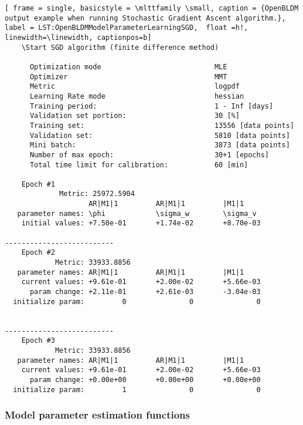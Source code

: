  \begin{lstlisting}[ frame = single, basicstyle = \mlttfamily \small, caption = {OpenBLDM output example when running Stochastic Gradient Ascent algorithm.}, label = LST:OpenBLDMModelParameterLearningSGD,  float =h!, linewidth=\linewidth, captionpos=b]
    \Start SGD algorithm (finite difference method)

      Optimization mode                           MLE
      Optimizer                                   MMT
      Metric                                      logpdf
      Learning Rate mode                          hessian
      Training period:                            1 - Inf [days]
      Validation set portion:                     30 [%]
      Training set:                               13556 [data points]
      Validation set:                             5810 [data points]
      Mini batch:                                 3873 [data points]
      Number of max epoch:                        30+1 [epochs]
      Total time limit for calibration:           60 [min]

    Epoch #1
             Metric: 25972.5904
                    AR|M1|1         AR|M1|1         |M1|1           
   parameter names: \phi            \sigma_w        \sigma_v        
    initial values: +7.50e-01       +1.74e-02       +8.70e-03       

--------------------------
    Epoch #2
            Metric: 33933.8856
   parameter names: AR|M1|1         AR|M1|1         |M1|1           
    current values: +9.61e-01       +2.00e-02       +5.66e-03      
      param change: +2.11e-01       +2.61e-03       -3.04e-03      
  initialize param:         0               0               0      


--------------------------
    Epoch #3
            Metric: 33933.8856
   parameter names: AR|M1|1         AR|M1|1         |M1|1           
    current values: +9.61e-01       +2.00e-02       +5.66e-03      
      param change: +0.00e+00       +0.00e+00       +0.00e+00      
  initialize param:         1               0               0 
\end{lstlisting}










\subsubsection{Model parameter estimation functions}

